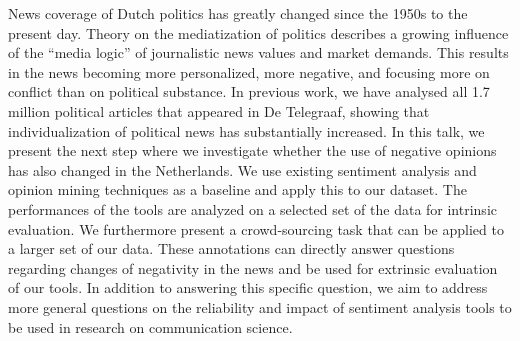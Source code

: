 \documentclass[10pt, a4paper, twopage, headinclude, footinclude, BCOR5mm]{scrartcl}
\begin{document}
        \begin{table}[t!]
    \end{table}
        \begin{table}[t!]
    \end{table}

\noindent
News coverage of Dutch politics has greatly changed since the 1950s to the present day. Theory on the mediatization of politics describes a growing influence of the “media logic” of journalistic news values and market demands. This results in the news becoming more personalized, more negative, and focusing more on conflict than on political substance.  In previous work, we have analysed all 1.7 million political articles that appeared in De Telegraaf, showing that individualization of political news has substantially increased. In this talk, we present the next step where we investigate whether the use of negative opinions has also changed in the Netherlands.  We use existing sentiment analysis and opinion mining techniques as a baseline and apply this to our dataset. The performances of the tools are analyzed on a selected set of the data for intrinsic evaluation. We furthermore present a crowd-sourcing task that can be applied to a larger set of our data. These annotations can directly answer questions regarding changes of negativity in the news and be used for extrinsic evaluation of our tools. In addition to answering this specific question, we aim to address more general questions on the reliability and impact of sentiment analysis tools to be used in research on communication science.
\end{document}
